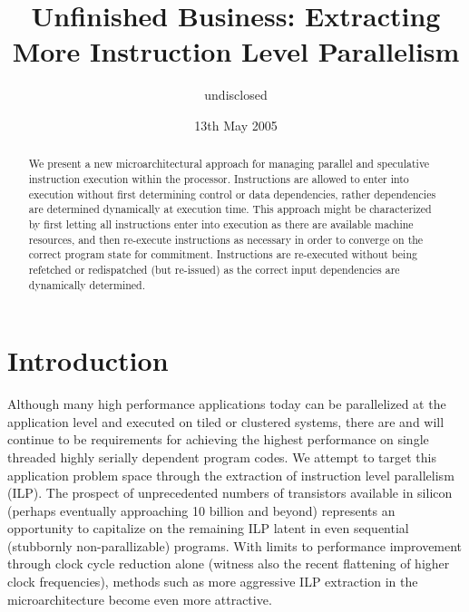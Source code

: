 \documentclass[10pt,twocolumn,dvips]{article}
\begin{document}
%
%
\title{Unfinished Business: Extracting More Instruction Level Parallelism}
%
%
\author{
undisclosed
}
%
%
\date{13th May 2005}
%
\maketitle
%
%
%
\begin{abstract}
%
We present a new microarchitectural approach
for managing parallel and speculative instruction execution
within the processor.  
Instructions are allowed to enter into
execution without first determining control or data dependencies,
rather dependencies are 
determined dynamically at execution time.
This approach might be
characterized by first letting all instructions enter
into execution as there are available machine resources,
and then re-execute instructions as necessary in order
to converge on the correct program state for commitment.
Instructions are re-executed without being refetched or redispatched
(but re-issued)
as the correct input
dependencies are dynamically determined.
%
\end{abstract}
%
%
\vspace{-0.15in}
\section{Introduction}
%
Although many high performance applications today
can be parallelized at the application level 
and executed on tiled or clustered systems,
there are and will continue
to be requirements for achieving the highest performance
on single threaded highly serially dependent program codes.
We attempt to target this application problem space
through the extraction of instruction level parallelism (ILP).
The prospect of unprecedented numbers of transistors 
available in silicon (perhaps eventually approaching 10 billion
and beyond) represents an opportunity to capitalize on
the remaining ILP latent in even sequential (stubbornly non-parallizable)
programs.
With limits to performance improvement through clock cycle reduction
alone (witness also the recent flattening of higher clock frequencies),
methods such as more aggressive ILP extraction in the microarchitecture
become even more attractive.
\end{document}
